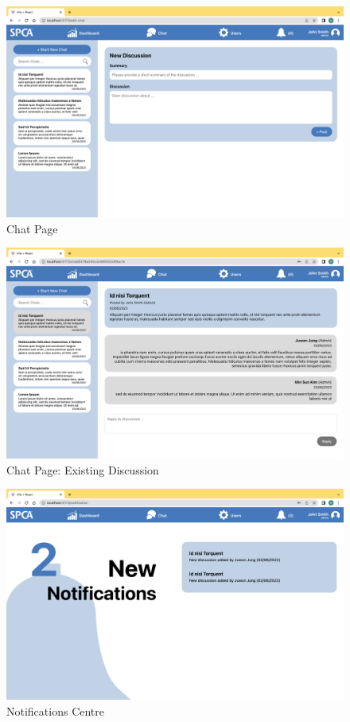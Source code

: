 \begin{figure}[h]
\centering
\includegraphics[width=\textwidth]{final-report/assets/web_new-chat.png}
\caption{Chat Page}
\end{figure}

\begin{figure}[h]
\centering
\includegraphics[width=\textwidth]{final-report/assets/web_chat.png}
\caption{Chat Page: Existing Discussion}
\end{figure}

\begin{figure}[h]
\centering
\includegraphics[width=\textwidth]{final-report/assets/web_notifications.png}
\caption{Notifications Centre}
\end{figure}

